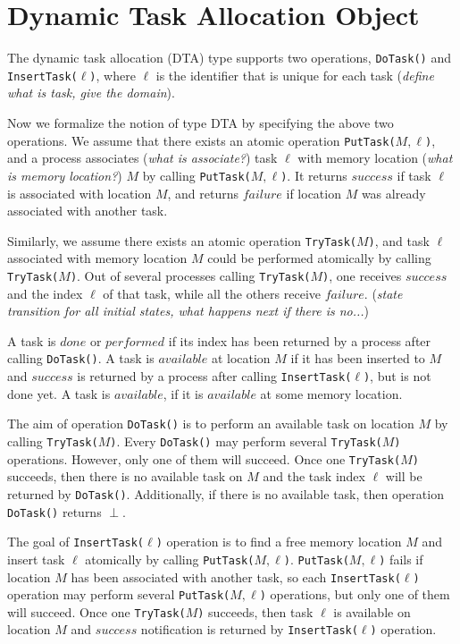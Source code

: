 \chapter{Dynamic Task Allocation Object}

The dynamic task allocation (DTA) type supports two operations, \texttt{DoTask()} and
\texttt{InsertTask(}$\ell$\texttt{)}, where $\ell$ is the identifier that is unique for each task (\emph{define what is task,
give the domain}).

Now we formalize the notion of type DTA by specifying the above two operations.
We assume that there exists an atomic operation \texttt{PutTask(}$M,\ell$\texttt{)},
and a process associates (\emph{what is associate?}) task $\ell$ with memory location (\emph{what is memory location?}) $M$
by calling \texttt{PutTask(}$M,\ell$\texttt{)}.
It returns $success$ if task $\ell$ is associated with location $M$, and returns $failure$ if location $M$ was
already associated with another task.


Similarly, we assume there exists an atomic operation \texttt{TryTask(}$M$\texttt{)}, and
task $\ell$ associated with memory location $M$ could be performed atomically by calling \texttt{TryTask(}$M$\texttt{)}.
Out of several processes calling \texttt{TryTask(}$M$\texttt{)}, one receives $success$ and the index $\ell$ of
that task, while all the others receive $failure$. (\emph{state transition for all initial states, what happens
next if there is no...})

A task is $done$ or $performed$ if its index has been returned by a process after calling \texttt{DoTask()}.
A task is $available$ at location $M$ if it has been inserted to $M$ and $success$ is returned by a process
after calling \texttt{InsertTask(}$\ell$\texttt{)}, but is not done yet. A task is $available$, if it is $available$
at some memory location.

The aim of operation \texttt{DoTask()} is to perform an available task on location $M$ by calling
\texttt{TryTask(}$M$\texttt{)}. Every \texttt{DoTask()} may perform several \texttt{TryTask(}$M$\texttt{)}
operations. However, only one of them will succeed. Once one \texttt{TryTask(}$M$\texttt{)} succeeds, then
there is no available task on $M$ and the task index $\ell$ will be returned by \texttt{DoTask()}. Additionally,
if there is no available task, then operation \texttt{DoTask()} returns $\perp$.

The goal of \texttt{InsertTask(}$\ell$\texttt{)} operation is to find a free memory location $M$ and insert
task $\ell$ atomically by calling \texttt{PutTask(}$M,\ell$\texttt{)}. \texttt{PutTask(}$M,\ell$\texttt{)}
fails if location $M$ has been associated with another task, so each \texttt{InsertTask(}$\ell$\texttt{)}
operation may perform several \texttt{PutTask(}$M,\ell$\texttt{)} operations, but only one of them will succeed.
Once one \texttt{TryTask(}$M$\texttt{)} succeeds, then task $\ell$ is available on location $M$ and $success$
notification is returned by \texttt{InsertTask(}$\ell$\texttt{)} operation.

